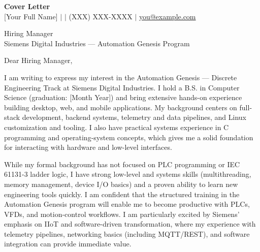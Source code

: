 \documentclass[11pt]{article}
\begin{document}
\newpage

\begin{center}
  {\Large \textbf{Cover Letter}}\\[6pt]
  {\normalsize [Your Full Name] \quad $|$  \quad $|$ \quad (XXX) XXX-XXXX \quad $|$ \quad \href{mailto:you@example.com}{you@example.com}}
\end{center}

\vspace{10pt}


\vspace{6pt}

\noindent Hiring Manager\\
Siemens Digital Industries — Automation Genesis Program\\

\vspace{8pt}

\noindent Dear Hiring Manager,

\vspace{6pt}

\noindent I am writing to express my interest in the Automation Genesis — Discrete Engineering Track at Siemens Digital Industries. I hold a B.S. in Computer Science (graduation: [Month Year]) and bring extensive hands-on experience building desktop, web, and mobile applications. My background centers on full-stack development, backend systems, telemetry and data pipelines, and Linux customization and tooling. I also have practical systems experience in C programming and operating-system concepts, which gives me a solid foundation for interacting with hardware and low-level interfaces.

\vspace{6pt}

\noindent While my formal background has not focused on PLC programming or IEC 61131-3 ladder logic, I have strong low-level and systems skills (multithreading, memory management, device I/O basics) and a proven ability to learn new engineering tools quickly. I am confident that the structured training in the Automation Genesis program will enable me to become productive with PLCs, VFDs, and motion-control workflows. I am particularly excited by Siemens' emphasis on IIoT and software-driven transformation, where my experience with telemetry pipelines, networking basics (including MQTT/REST), and software integration can provide immediate value.
\end{document}
